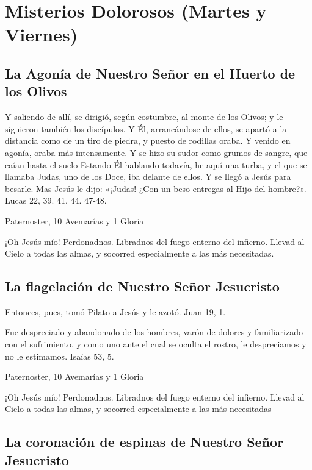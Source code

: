 \documentclass[a4paper,11pt, oneside]{report}
\begin{document}
    \section*{Misterios Dolorosos (Martes y Viernes)}
      
      \subsection*{La Agonía de Nuestro Señor en el Huerto de los Olivos}
        Y saliendo de allí, se dirigió, según costumbre, al monte de los Olivos; y le siguieron también los discípulos.
        Y Él, arrancándose de ellos, se apartó a la distancia como de un tiro de piedra, y puesto de rodillas oraba. 
        Y venido en agonía, oraba más intensamente. Y se hizo su sudor como grumos de sangre, que caían hasta el suelo
        Estando Él hablando todavía, he aquí una turba, y el que se llamaba Judas, uno de los Doce, iba delante de ellos. Y se llegó a Jesús para besarle.
        Mas Jesús le dijo: «¡Judas! ¿Con un beso entregas al Hijo del hombre?». Lucas 22, 39. 41. 44. 47-48.

         Paternoster, 10 Avemarías y 1 Gloria
        
        \medskip
        ¡Oh Jesús mío! Perdonadnos. Libradnos del fuego enterno del infierno. Llevad al Cielo a todas las almas, y socorred especialmente a las más necesitadas.
      
      \subsection*{La flagelación de Nuestro Señor Jesucristo}
        Entonces, pues, tomó Pilato a Jesús y le azotó. Juan 19, 1.
        
        \medskip
        Fue despreciado y abandonado de los hombres, varón de dolores y familiarizado con el sufrimiento, y como uno ante el cual
        se oculta el rostro, le despreciamos y no le estimamos. Isaías 53, 5.
        
         Paternoster, 10 Avemarías y 1 Gloria
        
        \medskip
        ¡Oh Jesús mío! Perdonadnos. Libradnos del fuego enterno del infierno. Llevad al Cielo a todas las almas, y socorred especialmente a las más 
        necesitadas
      
      \subsection*{La coronación de espinas de Nuestro Señor Jesucristo}
\end{document}
